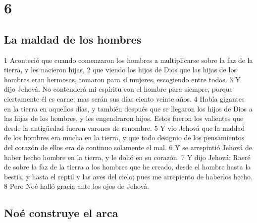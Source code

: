 \chapter{6}

\section*{La maldad de los hombres}

1 Aconteció que cuando comenzaron los hombres a multiplicarse sobre la faz de la tierra, y les nacieron hijas,
2 que viendo los hijos de Dios que las hijas de los hombres eran hermosas, tomaron para sí mujeres, escogiendo entre todas.
3 Y dijo Jehová: No contenderá mi espíritu con el hombre para siempre, porque ciertamente él es carne; mas serán sus días ciento veinte años.
4 Había gigantes en la tierra en aquellos días, y también después que se llegaron los hijos de Dios a las hijas de los hombres, y les engendraron hijos. Estos fueron los valientes que desde la antigüedad fueron varones de renombre.
5 Y vio Jehová que la maldad de los hombres era mucha en la tierra, y que todo designio de los pensamientos del corazón de ellos era de continuo solamente el mal.
6 Y se arrepintió Jehová de haber hecho hombre en la tierra, y le dolió en su corazón.
7 Y dijo Jehová: Raeré de sobre la faz de la tierra a los hombres que he creado, desde el hombre hasta la bestia, y hasta el reptil y las aves del cielo; pues me arrepiento de haberlos hecho.
8 Pero Noé halló gracia ante los ojos de Jehová.

\section*{Noé construye el arca}

